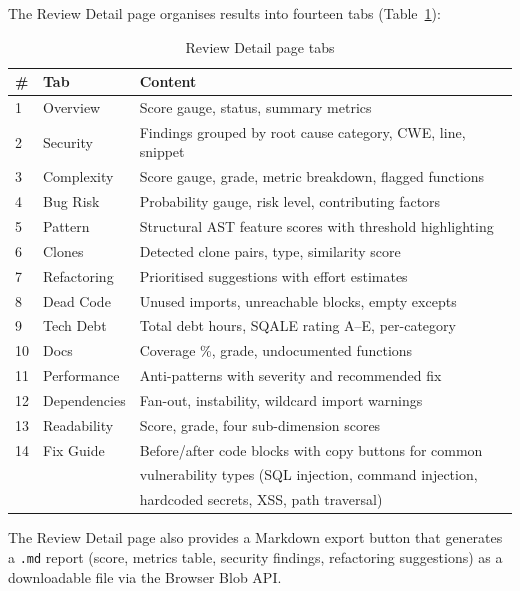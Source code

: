 \documentclass[12pt, oneside]{report}
\begin{document}
The Review Detail page organises results into fourteen tabs (Table~\ref{tab:tabs}):

\begin{table}[H]
\centering
\caption{Review Detail page tabs}
\label{tab:tabs}
\begin{tabular}{@{}lll@{}}
\toprule
\textbf{\#} & \textbf{Tab} & \textbf{Content} \\
\midrule
1  & Overview       & Score gauge, status, summary metrics \\
2  & Security       & Findings grouped by root cause category, CWE, line, snippet \\
3  & Complexity     & Score gauge, grade, metric breakdown, flagged functions \\
4  & Bug Risk       & Probability gauge, risk level, contributing factors \\
5  & Pattern        & Structural AST feature scores with threshold highlighting \\
6  & Clones         & Detected clone pairs, type, similarity score \\
7  & Refactoring    & Prioritised suggestions with effort estimates \\
8  & Dead Code      & Unused imports, unreachable blocks, empty excepts \\
9  & Tech Debt      & Total debt hours, SQALE rating A--E, per-category \\
10 & Docs           & Coverage \%, grade, undocumented functions \\
11 & Performance    & Anti-patterns with severity and recommended fix \\
12 & Dependencies   & Fan-out, instability, wildcard import warnings \\
13 & Readability    & Score, grade, four sub-dimension scores \\
14 & Fix Guide      & Before/after code blocks with copy buttons for common \\
   &                & vulnerability types (SQL injection, command injection, \\
   &                & hardcoded secrets, XSS, path traversal) \\
\bottomrule
\end{tabular}
\end{table}

The Review Detail page also provides a Markdown export button that generates a
\texttt{.md} report (score, metrics table, security findings, refactoring suggestions)
as a downloadable file via the Browser Blob API.
\end{document}
